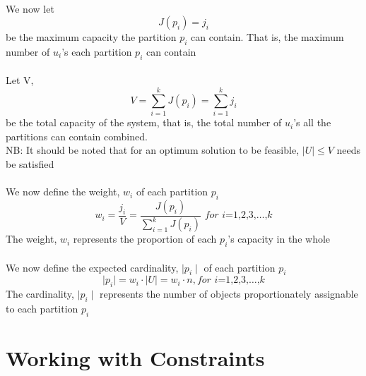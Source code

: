 \documentclass[a4paper,openany]{book}
\begin{document}
			\paragraph{}We now let
				\begin{equation}
					J(p_i) = j_i
				\end{equation}
				be the maximum capacity the partition $p_i$ can contain. That is, the maximum number of $u_i$'s each partition $p_i$ can contain
			\paragraph{}Let V,
				\begin{equation}
					V = \sum_{ i = 1 }^{k}{J(p_i)} = \sum_{i=1}^{k}{j_i}
				\end{equation}
				be the total capacity of the system, that is, the total number of $u_i$'s all the partitions can contain combined.\\
				NB: It should be noted that for an optimum solution to be feasible, $\mid U \mid \leq V$ needs be satisfied
			\paragraph{}We
				now define the weight, $w_i$ of each partition $p_i$
				\begin{equation}
					w_i = \frac{j_i}{V} = \frac{J(p_i)}{\sum_{i=1}^{k}{J(p_i)}}  \textit{ for i=1,2,3,}\dots\text{,}k
				\end{equation}
				The weight, $w_i$ represents the proportion of each $p_i$'s capacity in the whole
			\paragraph{}We 
				now define the expected cardinality, $\mid p_i \mid$ of each partition $p_i$
				\begin{equation}
					\mid p_i \mid = w_i \cdot \mid U \mid = w_i \cdot n, \textit{for i=1,2,3,}\dots\text{,}k
				\end{equation}
				The cardinality, $\mid p_i \mid$ represents the number of objects proportionately assignable to each partition $p_i$
		\section{Working with Constraints}
\end{document}
